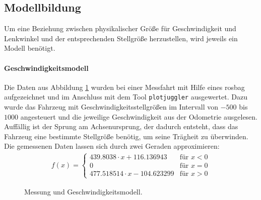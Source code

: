 \subsection{Modellbildung}
\label{subsec:02modellbildung}
Um eine Beziehung zwischen physikalischer Gr\"o\ss{}e f\"ur Geschwindigkeit und Lenkwinkel und der entsprechenden Stellgr\"o\ss{}e herzustellen, wird jeweils ein Modell ben\"otigt.
\paragraph{Geschwindigkeitsmodell} 
Die Daten aus Abbildung \ref{fig:Geschwindigkeitsmodell} wurden bei einer Messfahrt mit Hilfe eines rosbag aufgezeichnet und im Anschluss mit dem Tool \texttt{plotjuggler} ausgewertet. Dazu wurde das Fahrzeug mit Geschwindigkeitsstellgr\"o\ss{}en im Intervall von $-500$ bis $1000$ angesteuert und die jeweilige Geschwindigkeit aus der Odometrie ausgelesen. Auff\"allig ist der Sprung am Achsenursprung, der dadurch entsteht, dass das Fahrzeug eine bestimmte Stellgr\"o\ss{}e ben\"otig, um seine Tr\"agheit zu \"uberwinden.
Die gemessenen Daten lassen sich durch zwei Geraden approximieren:
\begin{align*}
  f(x) =
  \begin{cases}
  439.8038\cdot x+116.136943 & \text{f\"ur } x < 0 \\
  0 & \text{f\"ur } x=0\\
  477.518514\cdot x-104.623299 & \text{f\"ur } x > 0 
  \end{cases}
\end{align*}

\begin{figure}[H]
	\centering
	\caption{Messung und Geschwindigkeitsmodell.}
	\label{fig:Geschwindigkeitsmodell}
\end{figure}

